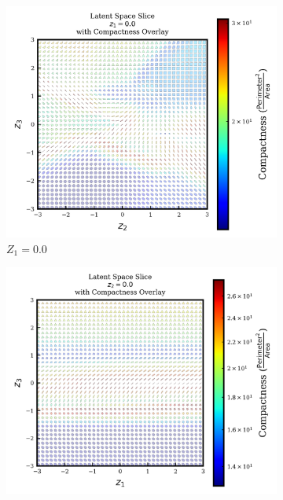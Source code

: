 \documentclass{article}
\begin{document}
\begin{figure}[H]
  \centering
  \begin{subfigure}{0.3\textwidth}
    \centering
    \includegraphics[height=0.2\textheight]{figures/VAEmodels/model2/fix_z1_0.0.png}
    \caption{$Z_1=0.0$}
    \label{fig:model2_fixz1_latent}
  \end{subfigure}
  \hfill
  \begin{subfigure}{0.3\textwidth}
    \centering
    \includegraphics[height=0.2\textheight]{figures/VAEmodels/model2/fix_z2_0.0.png}

\end{subfigure}
\end{figure}
\end{document}
